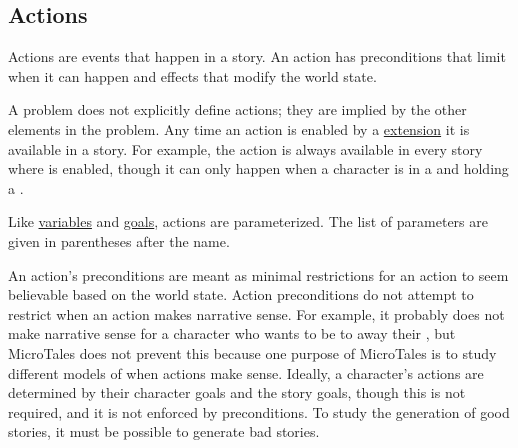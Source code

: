 \documentclass{nilreport}
\begin{document}


\newpage

\subsection{Actions} \label{sec:actions}

Actions are events that happen in a story. An action has preconditions that limit when it can happen and effects that modify the world state.

A problem does not explicitly define actions; they are implied by the other elements in the problem. Any time an action is enabled by a \hyperref[sec:extensions]{extension} it is available in a story. For example, the  action is always available in every story where  is enabled, though it can only happen when a character is in a  and holding a .

Like \hyperref[sec:variables]{variables} and \hyperref[sec:goals]{goals}, actions are parameterized. The list of parameters are given in parentheses after the name.

An action's preconditions are meant as minimal restrictions for an action to seem believable based on the world state. Action preconditions do not attempt to restrict when an action makes narrative sense. For example, it probably does not make narrative sense for a character who wants to be  to  away their , but MicroTales does not prevent this because one purpose of MicroTales is to study different models of when actions make sense. Ideally, a character's actions are determined by their character goals and the story goals, though this is not required, and it is not enforced by preconditions. To study the generation of good stories, it must be possible to generate bad stories.
\end{document}
